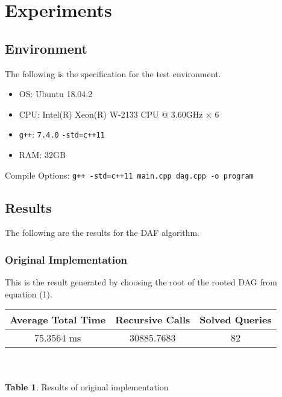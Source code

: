 \documentclass[12pt]{article}
\begin{document}
\section{Experiments}
\subsection{Environment}
The following is the specification for the test environment.
\begin{itemize}
	\item OS: Ubuntu 18.04.2
	\item CPU: Intel(R) Xeon(R) W-2133 CPU @ 3.60GHz $\times$ 6
	\item \texttt{g++}: \texttt{7.4.0} \texttt{-std=c++11}
	\item RAM: 32GB  
\end{itemize}
Compile Options:
\texttt{g++ -std=c++11 main.cpp dag.cpp -o program}

\subsection{Results}
The following are the results for the DAF algorithm.
\subsubsection{Original Implementation}
This is the result generated by choosing the root of the rooted DAG from equation (1).
\begin{center}
	\begin{tabular}{|c|c|c|}
		\hline
		Average Total Time & Recursive Calls & Solved Queries  \\ \hline
		75.3564 ms & 30885.7683 & 82\\ \hline 
	\end{tabular}\\~\\
\textbf{Table 1}. Results of original implementation
\end{center}
\end{document}
